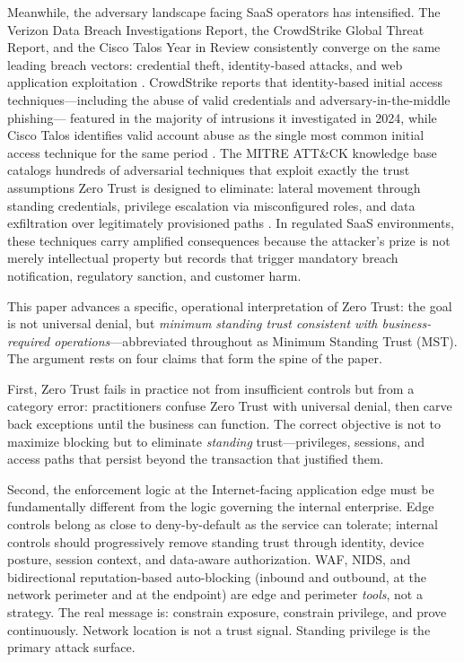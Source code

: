 \documentclass[acmlarge]{acmart}
\begin{document}
Meanwhile, the adversary landscape facing SaaS operators has intensified. The Verizon Data
Breach Investigations Report, the CrowdStrike Global Threat Report, and the Cisco Talos
Year in Review consistently converge on the same leading breach vectors: credential theft,
identity-based attacks, and web application exploitation \cite{verizon2025,crowdstrike2025,ciscotalos2025}. CrowdStrike reports that identity-based initial access
techniques---including the abuse of valid credentials and adversary-in-the-middle phishing---
featured in the majority of intrusions it investigated in 2024, while Cisco Talos identifies
valid account abuse as the single most common initial access technique for the same
period \cite{crowdstrike2025,ciscotalos2025}. The MITRE ATT\&CK knowledge base
catalogs hundreds of adversarial techniques that exploit exactly the trust assumptions Zero
Trust is designed to eliminate: lateral movement through standing credentials,
privilege escalation via misconfigured roles, and data exfiltration over legitimately
provisioned paths \cite{strom2018}. In regulated SaaS environments, these techniques
carry amplified consequences because the attacker's prize is not merely intellectual property
but records that trigger mandatory breach notification, regulatory sanction, and customer
harm.

This paper advances a specific, operational interpretation of Zero Trust: the goal is
not universal denial, but \textit{minimum standing trust consistent with
business-required operations}---abbreviated throughout as Minimum Standing Trust (MST).
The argument rests on four claims that form the spine of the paper.

First, Zero Trust fails in practice not from insufficient controls but from a
category error: practitioners confuse Zero Trust with universal denial, then carve
back exceptions until the business can function. The correct objective is not to
maximize blocking but to eliminate \textit{standing} trust---privileges, sessions,
and access paths that persist beyond the transaction that justified them.

Second, the enforcement logic at the Internet-facing application edge must be
fundamentally different from the logic governing the internal enterprise. Edge controls
belong as close to deny-by-default as the service can tolerate; internal controls
should progressively remove standing trust through identity, device posture, session
context, and data-aware authorization. WAF, NIDS, and bidirectional reputation-based
auto-blocking (inbound and outbound, at the network perimeter and at the endpoint) are
edge and perimeter \textit{tools}, not a strategy. The real message is: constrain exposure, constrain
privilege, and prove continuously. Network location is not a trust signal. Standing
privilege is the primary attack surface.
\end{document}
